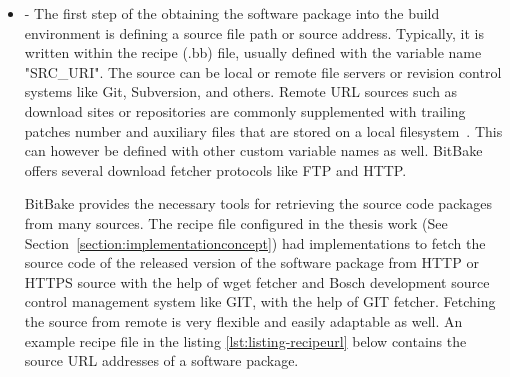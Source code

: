 \begin{itemize}
 
\item {} - The first step of the obtaining the software package into the build environment is defining a source file path or source address. Typically, it is written within the recipe (.bb) file, usually defined with the variable name "SRC\_URI". The source can be local or remote file servers or revision control systems like Git, Subversion, and others. Remote \ac{URL} sources such as download sites or repositories are commonly supplemented with trailing patches number and auxiliary files that are stored on a local filesystem~\parencite{Reference1}. This can however be defined with other custom variable names as well. BitBake offers several download fetcher protocols like \ac{FTP} and \ac{HTTP}. 

BitBake provides the necessary tools for retrieving the source code packages from many sources. The recipe file configured in the thesis work (See Section~\ref{section:implementationconcept}) had implementations to fetch the source code of the released version of the software package from \ac{HTTP} or \ac{HTTPS} source with the help of wget fetcher and Bosch development source control management system like GIT, with the help of GIT fetcher. Fetching the source from remote is very flexible and easily adaptable as well. An example recipe file in the listing \ref{lst:listing-recipeurl} below contains the source \ac{URL} addresses of a software package.

\vspace{0.5cm}
\lstset{style=mystyle}

\vspace{0.5cm}


\end{itemize}
